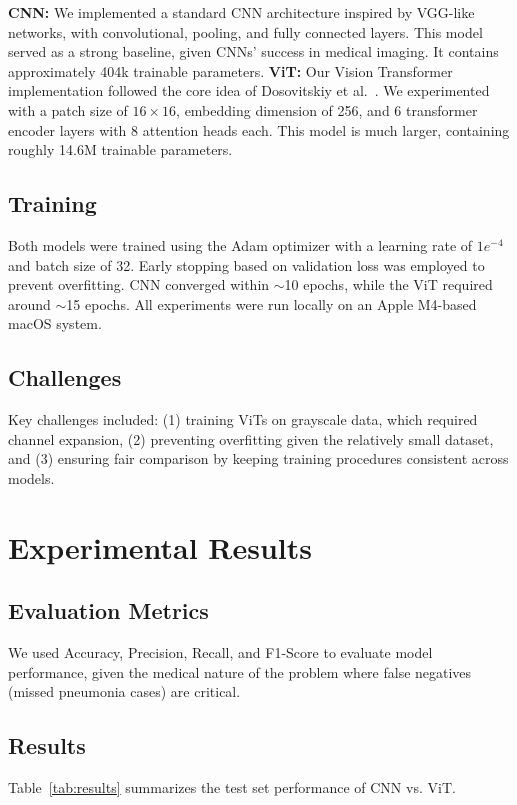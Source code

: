 \documentclass{article}
\begin{document}
\textbf{CNN:} We implemented a standard CNN architecture inspired by VGG-like networks, with convolutional, pooling, and fully connected layers. This model served as a strong baseline, given CNNs' success in medical imaging. It contains approximately 404k trainable parameters.
\textbf{ViT:} Our Vision Transformer implementation followed the core idea of Dosovitskiy et al.~\cite{https://arxiv.org/pdf/2010.11929}. We experimented with a patch size of $16 \times 16$, embedding dimension of 256, and 6 transformer encoder layers with 8 attention heads each. This model is much larger, containing roughly 14.6M trainable parameters.

\subsection{Training}
Both models were trained using the Adam optimizer with a learning rate of $1e^{-4}$ and batch size of 32. Early stopping based on validation loss was employed to prevent overfitting. CNN converged within $\sim$10 epochs, while the ViT required around $\sim$15 epochs. All experiments were run locally on an Apple M4-based macOS system.

\subsection{Challenges}
Key challenges included: (1) training ViTs on grayscale data, which required channel expansion, (2) preventing overfitting given the relatively small dataset, and (3) ensuring fair comparison by keeping training procedures consistent across models.

\section{Experimental Results}

\subsection{Evaluation Metrics}
We used Accuracy, Precision, Recall, and F1-Score to evaluate model performance, given the medical nature of the problem where false negatives (missed pneumonia cases) are critical.

\subsection{Results}
Table~\ref{tab:results} summarizes the test set performance of CNN vs. ViT.
\end{document}
